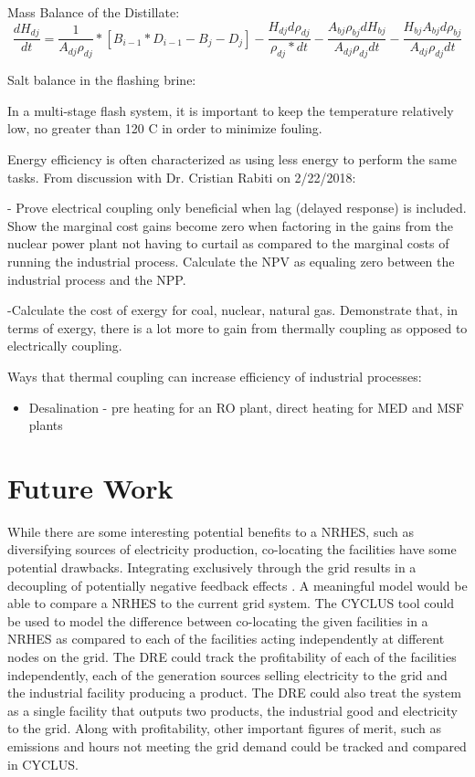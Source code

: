 \documentclass[12pt]{UIdahoMastersThesis}
\begin{document}
Mass Balance of the Distillate:
\begin{equation*}
\frac{dH_{dj}}{dt}=\frac{1}{A_{dj}{\rho_{dj}}}*[B_{i-1}*D_{i-1}-B_j-D_j]-\frac{H_{dj}d\rho_{dj}}{\rho_{dj}*dt}-\frac{A_{bj}\rho_{bj}dH_{bj}}{A_{dj}\rho_{dj}dt}-\frac{H_{bj}A_{bj}d\rho_{bj}}{A_{dj}\rho_{dj}dt}
\end{equation*}

Salt balance in the flashing brine:

In a multi-stage flash system, it is important to keep the temperature relatively low, no greater than 120 \degree C in order to minimize fouling.


Energy efficiency is often characterized as using less energy to perform the same tasks.
From discussion with Dr. Cristian Rabiti on 2/22/2018:

- Prove electrical coupling only beneficial when lag (delayed response) is included.  Show the marginal cost gains become zero when factoring in the gains from the nuclear power plant not having to curtail as compared to the marginal costs of running the industrial process. Calculate the NPV as equaling zero between the industrial process and the NPP.

-Calculate the cost of exergy for coal, nuclear, natural gas.  Demonstrate that, in terms of exergy, there is a lot more to gain from thermally coupling as opposed to electrically coupling.

Ways that thermal coupling can increase efficiency of industrial processes:
\begin{itemize}
\item Desalination - pre heating for an RO plant, direct heating for MED and MSF plants
\end{itemize}



\chapter{Future Work}
While there are some interesting potential benefits to a NRHES, such as diversifying sources of electricity production, co-locating the facilities have some potential drawbacks.  Integrating exclusively through the grid results in a decoupling of potentially negative feedback effects \cite{Harrison2016}.  A meaningful model would be able to compare a NRHES to the current grid system. The CYCLUS tool could be used to model the difference between co-locating the given facilities in a NRHES as compared to each of the facilities acting independently at different nodes on the grid.  The DRE could track the profitability of each of the facilities independently, each of the generation sources selling electricity to the grid and the industrial facility producing a product.  The DRE could also treat the system as a single facility that outputs two products, the industrial good and electricity to the grid. Along with profitability, other important figures of merit, such as emissions and hours not meeting the grid demand could be tracked and compared in CYCLUS.
\end{document}

